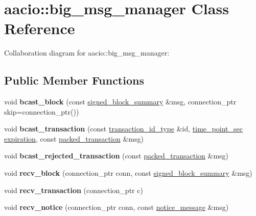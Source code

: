 \hypertarget{classaacio_1_1big__msg__manager}{}\section{aacio\+:\+:big\+\_\+msg\+\_\+manager Class Reference}
\label{classaacio_1_1big__msg__manager}


Collaboration diagram for aacio\+:\+:big\+\_\+msg\+\_\+manager\+:
\subsection*{Public Member Functions}
\begin{DoxyCompactItemize}
\item 
\mbox{\label{classaacio_1_1big__msg__manager_a30244b65bf7a21b4183949f04c503b9b}} 
void {\bfseries bcast\+\_\+block} (const \mbox{\hyperlink{structaacio_1_1chain_1_1signed__block__summary}{signed\+\_\+block\+\_\+summary}} \&msg, connection\+\_\+ptr skip=connection\+\_\+ptr())
\item 
\mbox{\label{classaacio_1_1big__msg__manager_ae2dbfa862a946f9ab320248991362382}} 
void {\bfseries bcast\+\_\+transaction} (const \mbox{\hyperlink{classfc_1_1sha256}{transaction\+\_\+id\+\_\+type}} \&id, \mbox{\hyperlink{classfc_1_1time__point__sec}{time\+\_\+point\+\_\+sec}} \mbox{\hyperlink{group__transactioncapi_ga284f37e545cbb7f847f3ab86f50feb1d}{expiration}}, const \mbox{\hyperlink{structaacio_1_1chain_1_1packed__transaction}{packed\+\_\+transaction}} \&msg)
\item 
\mbox{\label{classaacio_1_1big__msg__manager_a3b6d8e2b4d3bda982dfe402c28c11d84}} 
void {\bfseries bcast\+\_\+rejected\+\_\+transaction} (const \mbox{\hyperlink{structaacio_1_1chain_1_1packed__transaction}{packed\+\_\+transaction}} \&msg)
\item 
\mbox{\label{classaacio_1_1big__msg__manager_a76c6828ef8fd7394e35fb45086e6b2e3}} 
void {\bfseries recv\+\_\+block} (connection\+\_\+ptr conn, const \mbox{\hyperlink{structaacio_1_1chain_1_1signed__block__summary}{signed\+\_\+block\+\_\+summary}} \&msg)
\item 
\mbox{\label{classaacio_1_1big__msg__manager_a920ded35f5230adfc7f5a5fd0c338ade}} 
void {\bfseries recv\+\_\+transaction} (connection\+\_\+ptr c)
\item 
\mbox{\label{classaacio_1_1big__msg__manager_acb09da9c81fc6bd2d19665b98e4d2d08}} 
void {\bfseries recv\+\_\+notice} (connection\+\_\+ptr conn, const \mbox{\hyperlink{structaacio_1_1notice__message}{notice\+\_\+message}} \&msg)
\end{DoxyCompactItemize}
